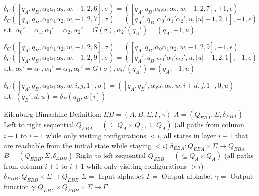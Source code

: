 \documentclass[12pt, a4paper]{article}
\begin{document}
\begin{algorithmic}
    \STATE $\delta_C([q_A, q_B, \alpha_0 \alpha_1 \alpha_2, w, -1, 2, 6], \sigma) = ([q_A, q_B, \alpha_0 \alpha_1 \alpha_2, w, -1, 2, 7], +1, \epsilon)$
    \STATE $\delta_C([q_A, q_B, \alpha_0 \alpha_1 \alpha_2, w, -1, 2, 7], \sigma) = ([q_A', q_B, \alpha_0' \alpha_1' \alpha_2', u, |u|-1, 2, 1], -1, \epsilon)$\\s.t. $\alpha_0' = \alpha_1, \alpha_1' = \alpha_2, \alpha_2' = G(\sigma), \alpha_2'(q_A') = (q_A, -1, u)$

    \STATE $\delta_C([q_A, q_B, \alpha_0 \alpha_1 \alpha_2, w, -1, 2, 8], \sigma) = ([q_A, q_B, \alpha_0 \alpha_1 \alpha_2, w, -1, 2, 9], -1, \epsilon)$
    \STATE $\delta_C([q_A, q_B, \alpha_0 \alpha_1 \alpha_2, w, -1, 2, 9], \sigma) = ([q_A', q_B, \alpha_0' \alpha_1' \alpha_2', u, |u|-1, 2, 1], +1, \epsilon)$\\s.t. $\alpha_2' = \alpha_1, \alpha_1' = \alpha_0, \alpha_0' = G(\sigma), \alpha_0'(q_A') = (q_A, -1, u)$

    \STATE $\delta_C([q_A, q_B, \alpha_0 \alpha_1 \alpha_2, w, i, j, 1], \sigma) = ([q_A, q_B', \alpha_0 \alpha_1 \alpha_2, w, i+d, j, 1], 0, u)$\\s.t. $(q_B', d, u) = \delta_B(q_B, w[i])$
\end{algorithmic}
\pagebreak
\begin{algorithmic}
    \STATE Eilenburg Bimachine Definition:
    \STATE $EB = (A, B, \Sigma, \Gamma, \gamma)$
    \STATE $A = (Q_{EBA}, \Sigma, \delta_{EBA})$ Left to right sequential
    \STATE $Q_{EBA} = (\subseteq Q_A \times Q_A, \subseteq Q_A)$ (all paths from column $i-1$ to $i-1$ while only visiting configurations $< i$, all states in layer $i-1$ that are reachable from the initial state while staying $< i$)
    \STATE $\delta_{EBA}: Q_{EBA} \times \Sigma \to Q_{EBA}$
    \STATE $B = (Q_{EBB}, \Sigma, \delta_{EBB})$ Right to left sequential
    \STATE $Q_{EBB} = (\subseteq Q_A \times Q_A)$ (all paths from column $i+1$ to $i + 1$ while only visiting configurations $> i$)
    \STATE $\delta_{EBB}: Q_{EBB} \times \Sigma \to Q_{EBB}$
    \STATE $\Sigma = $ Input alphabet
    \STATE $ \Gamma = $ Output alphabet
    \STATE $\gamma = $ Output function
    \STATE $\gamma: Q_{EBA} \times Q_{EBB} \times \Sigma \to \Gamma$
\end{algorithmic}
\end{document}
